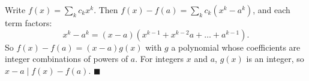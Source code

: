 Write $f(x)=\sum_k c_kx^k$. Then $f(x)-f(a)=\sum_k c_k\left(x^k-a^k\right)$, and each term factors:
\[
x^k-a^k=(x-a)\left(x^{k-1}+x^{k-2}a+\dots+a^{k-1}\right).
\]
So $f(x)-f(a)=(x-a)g(x)$ with $g$ a polynomial whose coefficients are integer combinations of powers of $a$. For integers $x$ and $a$, $g(x)$ is an integer, so $x-a\mid f(x)-f(a)$. $\blacksquare$
